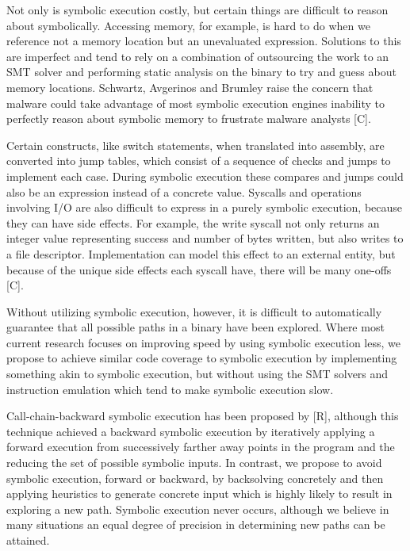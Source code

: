 \documentclass[11pt,expanded,copyright]{fsuthesis}
\begin{document}
Not only is symbolic execution costly, but certain things are difficult to reason about symbolically. Accessing memory, for example, is hard to do when we reference not a memory location but an unevaluated expression. Solutions to this are imperfect and tend to rely on a combination of outsourcing the work to an SMT solver and performing static analysis on the binary to try and guess about memory locations. Schwartz, Avgerinos and Brumley raise the concern that malware could take advantage of most symbolic execution engines inability to perfectly reason about symbolic memory to frustrate malware analysts [C].

Certain constructs, like switch statements, when translated into assembly, are converted into jump tables, which consist of a sequence of checks and jumps to implement each case. During symbolic execution these compares and jumps could also be an expression instead of a concrete value. Syscalls and operations involving I/O are also difficult to express in a purely symbolic execution, because they can have side effects. For example, the write syscall not only returns an integer value representing success and number of bytes written, but also writes to a file descriptor. Implementation can model this effect to an external entity, but because of the unique side effects each syscall have, there will be many one-offs [C]. 

Without utilizing symbolic execution, however, it is difficult to automatically guarantee that all possible paths in a binary have been explored. Where most current research focuses on improving speed by using symbolic execution less, we propose to achieve similar code coverage to symbolic execution by implementing something akin to symbolic execution, but without using the SMT solvers and instruction emulation which tend to make symbolic execution slow.

Call-chain-backward symbolic execution has been proposed by [R], although this technique achieved a backward symbolic execution by iteratively applying a forward execution from successively farther away points in the program and the reducing the set of possible symbolic inputs. In contrast, we propose to avoid symbolic execution, forward or backward, by backsolving concretely and then applying heuristics to generate concrete input which is highly likely to result in exploring a new path. Symbolic execution never occurs, although we believe in many situations an equal degree of precision in determining new paths can be attained.
\end{document}
